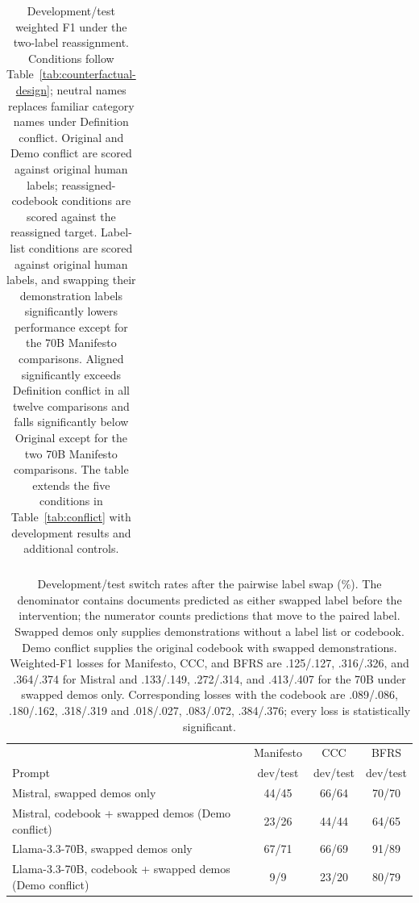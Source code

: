 \documentclass[11pt]{article}
\begin{document}
\begin{table}[!t]
\begin{tabular}{lcccccccccccc}
\bottomrule
\end{tabular}
\caption{Development/test weighted F1 under the two-label reassignment. Conditions follow Table~\ref{tab:counterfactual-design}; neutral names replaces familiar category names under Definition conflict. Original and Demo conflict are scored against original human labels; reassigned-codebook conditions are scored against the reassigned target. Label-list conditions are scored against original human labels, and swapping their demonstration labels significantly lowers performance except for the 70B Manifesto comparisons. Aligned significantly exceeds Definition conflict in all twelve comparisons and falls significantly below Original except for the two 70B Manifesto comparisons. The table extends the five conditions in Table~\ref{tab:conflict} with development results and additional controls.}
\label{tab:paired-full}
\end{table}


\begin{table}[!t]
\centering
\begin{tabular}{lccc}
\toprule
 & Manifesto & CCC & BFRS \\
Prompt & dev/test & dev/test & dev/test \\
\midrule
Mistral, swapped demos only & 44/45 & 66/64 & 70/70 \\
Mistral, codebook + swapped demos (Demo conflict) & 23/26 & 44/44 & 64/65 \\
Llama-3.3-70B, swapped demos only & 67/71 & 66/69 & 91/89 \\
Llama-3.3-70B, codebook + swapped demos (Demo conflict) & 9/9 & 23/20 & 80/79 \\
\bottomrule
\end{tabular}
\caption{Development/test switch rates after the pairwise label swap (\%). The denominator contains documents predicted as either swapped label before the intervention; the numerator counts predictions that move to the paired label. Swapped demos only supplies demonstrations without a label list or codebook. Demo conflict supplies the original codebook with swapped demonstrations. Weighted-F1 losses for Manifesto, CCC, and BFRS are .125/.127, .316/.326, and .364/.374 for Mistral and .133/.149, .272/.314, and .413/.407 for the 70B under swapped demos only. Corresponding losses with the codebook are .089/.086, .180/.162, .318/.319 and .018/.027, .083/.072, .384/.376; every loss is statistically significant.}
\label{tab:swap-loss}
\end{table}
\end{document}
